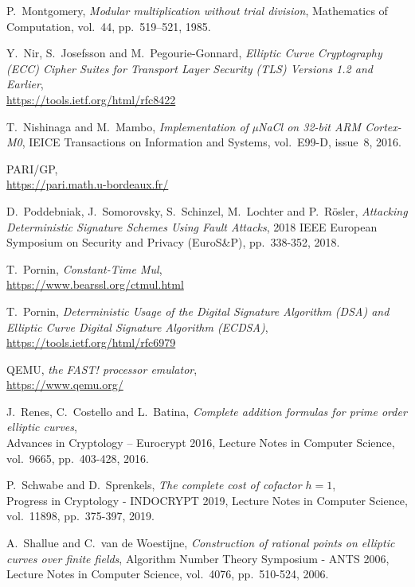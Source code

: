 \documentclass{llncs}
\begin{document}
\begin{thebibliography}{20}
P.~Montgomery,
\emph{Modular multiplication without trial division},
Mathematics of Computation, vol.~44, pp.~519–521, 1985.

Y.~Nir, S.~Josefsson and M.~Pegourie-Gonnard,
\emph{Elliptic Curve Cryptography (ECC) Cipher Suites for Transport
Layer Security (TLS) Versions 1.2 and Earlier},\\
\url{https://tools.ietf.org/html/rfc8422}

T.~Nishinaga and M.~Mambo,
\emph{Implementation of µNaCl on 32-bit ARM Cortex-M0},
IEICE Transactions on Information and Systems, vol.~E99-D, issue~8, 2016.

PARI/GP,\\
\url{https://pari.math.u-bordeaux.fr/}

D.~Poddebniak, J.~Somorovsky, S.~Schinzel, M.~Lochter and P.~Rösler,
\emph{Attacking Deterministic Signature Schemes Using Fault Attacks},
2018 IEEE European Symposium on Security and Privacy (EuroS\&P),
pp.~338-352, 2018.

T.~Pornin,
\emph{Constant-Time Mul},\\
\url{https://www.bearssl.org/ctmul.html}

T.~Pornin,
\emph{Deterministic Usage of the Digital Signature Algorithm (DSA) and
Elliptic Curve Digital Signature Algorithm (ECDSA)},\\
\url{https://tools.ietf.org/html/rfc6979}

QEMU,
\emph{the FAST! processor emulator},\\
\url{https://www.qemu.org/}

J.~Renes, C.~Costello and L.~Batina,
\emph{Complete addition formulas for prime order elliptic curves},\\
Advances in Cryptology – Eurocrypt 2016, Lecture Notes in Computer Science,
vol.~9665, pp.~403-428, 2016.

P.~Schwabe and D.~Sprenkels,
\emph{The complete cost of cofactor $h = 1$},\\
Progress in Cryptology - INDOCRYPT 2019, Lecture Notes in Computer Science,
vol.~11898, pp.~375-397, 2019.

A.~Shallue and C.~van de Woestijne,
\emph{Construction of rational points on elliptic curves over finite
fields},
Algorithm Number Theory Symposium - ANTS 2006, Lecture Notes in Computer
Science, vol.~4076, pp.~510-524, 2006.


\end{thebibliography}
\end{document}
